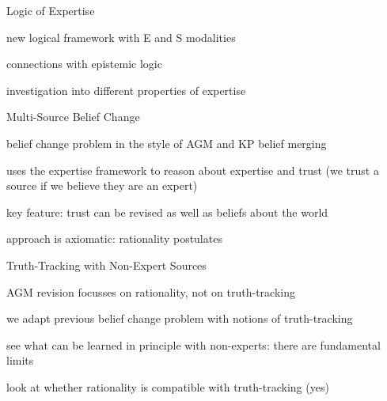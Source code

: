 \documentclass[10pt]{beamer}
\begin{document}
\begin{frame}{Logic of Expertise}
    \begin{nitemize}
        \item new logical framework with E and S modalities
        \item connections with epistemic logic
        \item investigation into different properties of expertise
    \end{nitemize}
\end{frame}

\begin{frame}{Multi-Source Belief Change}
    \begin{nitemize}
        \item belief change problem in the style of AGM and KP belief merging
        \item uses the expertise framework to reason about expertise and trust
            (we trust a source if we believe they are an expert)
        \item key feature: trust can be revised as well as beliefs about the
              world
        \item approach is axiomatic: rationality postulates
    \end{nitemize}
\end{frame}

\begin{frame}{Truth-Tracking with Non-Expert Sources}
    \begin{nitemize}
        \item AGM revision focusses on rationality, not on truth-tracking
        \item we adapt previous belief change problem with notions of
              truth-tracking
        \item see what can be learned in principle with non-experts: there are
              fundamental limits
          \item look at whether rationality is compatible with truth-tracking
              (yes)
    \end{nitemize}
\end{frame}
\end{document}
